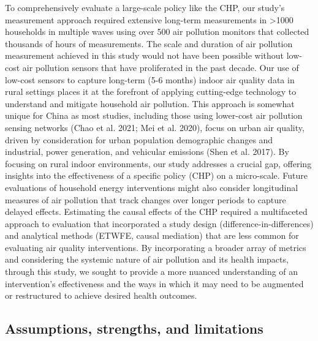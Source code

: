 \documentclass[
  letterpaper,
  DIV=11,
  numbers=noendperiod]{scrartcl}
\begin{document}
To comprehensively evaluate a large-scale policy like the CHP, our
study's measurement approach required extensive long-term measurements
in \textgreater1000 households in multiple waves using over 500 air
pollution monitors that collected thousands of hours of measurements.
The scale and duration of air pollution measurement achieved in this
study would not have been possible without low-cost air pollution
sensors that have proliferated in the past decade. Our use of low-cost
sensors to capture long-term (5-6 months) indoor air quality data in
rural settings places it at the forefront of applying cutting-edge
technology to understand and mitigate household air pollution. This
approach is somewhat unique for China as most studies, including those
using lower-cost air pollution sensing networks (Chao et al. 2021; Mei
et al. 2020), focus on urban air quality, driven by consideration for
urban population demographic changes and industrial, power generation,
and vehicular emissions (Shen et al. 2017). By focusing on rural indoor
environments, our study addresses a crucial gap, offering insights into
the effectiveness of a specific policy (CHP) on a micro-scale. Future
evaluations of household energy interventions might also consider
longitudinal measures of air pollution that track changes over longer
periods to capture delayed effects. Estimating the causal effects of the
CHP required a multifaceted approach to evaluation that incorporated a
study design (difference-in-differences) and analytical methods (ETWFE,
causal mediation) that are less common for evaluating air quality
interventions. By incorporating a broader array of metrics and
considering the systemic nature of air pollution and its health impacts,
through this study, we sought to provide a more nuanced understanding of
an intervention's effectiveness and the ways in which it may need to be
augmented or restructured to achieve desired health outcomes.

\subsection{Assumptions, strengths, and
limitations}\label{assumptions-strengths-and-limitations}
\end{document}
